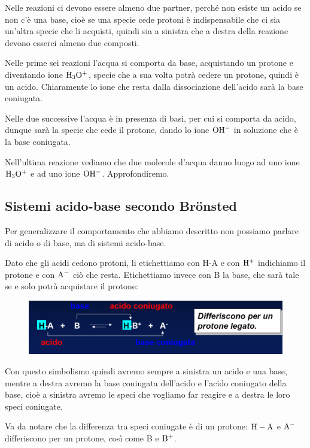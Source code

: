 Nelle reazioni ci devono essere almeno due partner, perché non esiste un acido se non c'è una base, cioè se una specie cede protoni è indispensabile che ci sia un'altra specie che li acquisti, quindi sia a sinistra che a destra della reazione devono esserci almeno due composti.

Nelle prime sei reazioni l'acqua si comporta da base, acquistando un protone e diventando ione $\rm H_3O^+$, specie che a sua volta potrà cedere un protone, quindi è un acido. Chiaramente lo ione che resta dalla dissociazione dell'acido sarà la base coniugata.

Nelle due successive l'acqua è in presenza di basi, per cui si comporta da acido, dunque sarà la specie che cede il protone, dando lo ione $\rm OH^-$ in soluzione che è la base coniugata.

Nell'ultima reazione vediamo che due molecole d'acqua danno luogo ad uno ione $\rm H_3O^+$ e ad uno ione $\rm OH^-$. Approfondiremo.
\subsection{Sistemi acido-base secondo Brönsted}
Per generalizzare il comportamento che abbiamo descritto non possiamo parlare di acido o di base, ma di sistemi acido-base.

Dato che gli acidi cedono protoni, li etichettiamo con H-A e con $\rm H^+$ indichiamo il protone e con $\rm A^-$ ciò che resta. Etichettiamo invece con B la base, che sarà tale se e solo potrà acquistare il protone:

\begin{figure}[H]
    \centering
    \includegraphics[width=12cm]{immagini/acido_base_coniugata.png}
\end{figure}

Con questo simbolismo quindi avremo sempre a sinistra un acido e una base, mentre a destra avremo la base coniugata dell'acido e l'acido coniugato della base, cioè a sinistra avremo le speci che vogliamo far reagire e a destra le loro speci coniugate.

Va da notare che la differenza tra speci coniugate è di un protone: $\rm H-A$ e $\rm A^-$ differiscono per un protone, così come B e $\rm B^+$.

